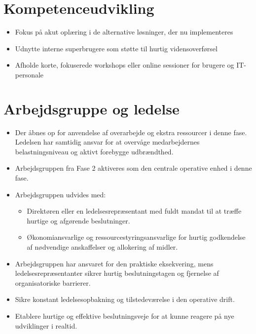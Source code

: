 \documentclass[a4paper,11pt,oneside]{book}
\def\tightlist{}
\begin{document}
\section{Kompetenceudvikling}\label{kompetenceudvikling}

\begin{itemize}
\tightlist
\item
  Fokus på akut oplæring i de alternative løsninger, der nu
  implementeres
\item
  Udnytte interne superbrugere som støtte til hurtig vidensoverførsel
\item
  Afholde korte, fokuserede workshops eller online sessioner for brugere
  og IT-personale
\end{itemize}

\section{Arbejdsgruppe og ledelse}\label{arbejdsgruppe-og-ledelse}

\begin{itemize}
\item
  Der åbnes op for anvendelse af overarbejde og ekstra ressourcer i
  denne fase. Ledelsen har samtidig ansvar for at overvåge
  medarbejdernes belastningsniveau og aktivt forebygge udbrændthed.
\item
  Arbejdsgruppen fra Fase 2 aktiveres som den centrale operative enhed i
  denne fase.
\item
  Arbejdsgruppen udvides med:

  \begin{itemize}
  \tightlist
  \item
    Direktøren eller en ledelsesrepræsentant med fuldt mandat til at
    træffe hurtige og afgørende beslutninger.
  \item
    Økonomiansvarlige og ressourcestyringsansvarlige for hurtig
    godkendelse af nødvendige anskaffelser og allokering af midler.
  \end{itemize}
\item
  Arbejdsgruppen har ansvaret for den praktiske eksekvering, mens
  ledelsesrepræsentanter sikrer hurtig beslutningstagen og fjernelse af
  organisatoriske barrierer.
\item
  Sikre konstant ledelsesopbakning og tilstedeværelse i den operative
  drift.
\item
  Etablere hurtige og effektive beslutningsveje for at kunne reagere på
  nye udviklinger i realtid.
\end{itemize}
\end{document}
